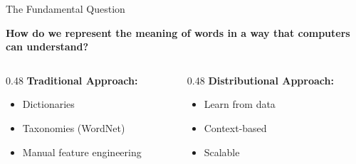 \documentclass[aspectratio=169]{beamer}
\begin{document}
\begin{frame}[shrink=10]{The Fundamental Question 🤔}
\begin{center}
\LARGE
\textbf{How do we represent the meaning of words in a way that computers can understand?}
\end{center}

\pause
\vspace{1em}

\begin{columns}[T]
\begin{column}{0.48\textwidth}
\textbf{Traditional Approach:}
\begin{itemize}\setlength{\itemsep}{0pt}
    \item Dictionaries
    \item Taxonomies (WordNet)
    \item Manual feature engineering
\end{itemize}
\end{column}

\begin{column}{0.48\textwidth}
\textbf{Distributional Approach:}
\begin{itemize}\setlength{\itemsep}{0pt}
    \item Learn from data
    \item Context-based
    \item Scalable
\end{itemize}
\end{column}
\end{columns}
\end{frame}
\end{document}
